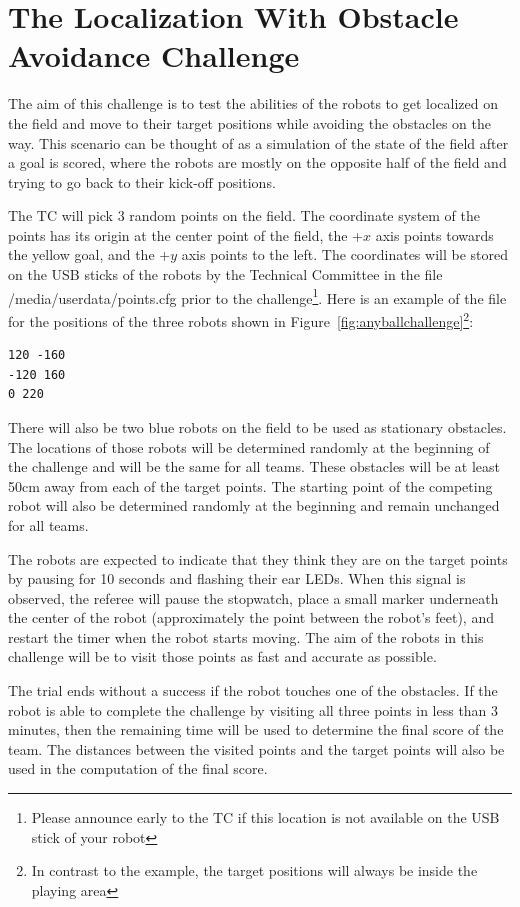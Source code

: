 \documentclass{article}
\begin{document}
\section{The Localization With Obstacle Avoidance Challenge}
\label{sec:localization}

The aim of this challenge is to test the abilities of the robots to get localized on the field and move to their target positions while avoiding the obstacles on the way. This scenario can be thought of as a simulation of the state of the field after a goal is scored, where the robots are mostly on the opposite half of the field and trying to go back to their kick-off positions. 

The TC will pick 3 random points on the field. The coordinate system of the points has its origin at the center point of the field, the +$x$ axis points towards the yellow goal, and the +$y$ axis points to the left. The coordinates will be stored on the USB sticks of the robots by the Technical Committee in the file /media/userdata/points.cfg prior to the challenge\footnote{Please announce early to the TC if this location is not available on the USB stick of your robot}. Here is an example of the file for the positions of the three robots shown in Figure~\ref{fig:anyballchallenge}\footnote{In contrast to the example, the target positions will always be inside the playing area}:
%
{\small\begin{verbatim}
120 -160
-120 160
0 220
\end{verbatim}
}
%
There will also be two blue robots on the field to be used as stationary obstacles. The locations of those robots will be determined randomly at the beginning of the challenge and will be the same for all teams. These obstacles will be at least 50cm away from each of the target points. The starting point of the competing robot will also be determined randomly at the beginning and remain unchanged for all teams. 

The robots are expected to indicate that they think they are on the target points by pausing for 10 seconds and flashing their ear LEDs. When this signal is observed, the referee will pause the stopwatch, place a small marker underneath the center of the robot (approximately the point between the robot's feet), and restart the timer when the robot starts moving. The aim of the robots in this challenge will be to visit those points as fast and accurate as possible.

The trial ends without a success if the robot touches one of the obstacles. If the robot is able to complete the challenge by visiting all three points in less than 3 minutes, then the remaining time will be used to determine the final score of the team. The distances between the visited points and the target points will also be used in the computation of the final score.
\end{document}
